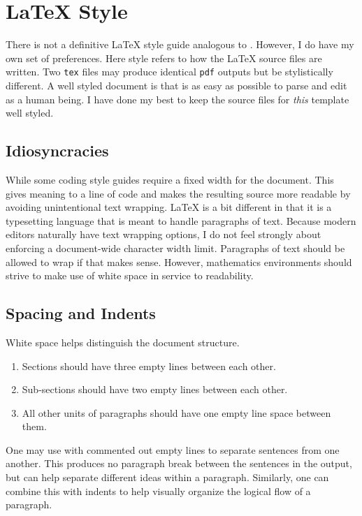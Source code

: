 
\section{\texorpdfstring{\LaTeX{} Style}{LaTeX Style}}

There is not a definitive \LaTeX{} style guide analogous to . However, I do have my own set of preferences. Here style refers to how the \LaTeX{} source files are written. Two \texttt{tex} files may produce identical \texttt{pdf} outputs but be stylistically different. A well styled document is that is as easy as possible to parse and edit as a human being. I have done my best to keep the source files for \emph{this} template well styled.


\subsection{Idiosyncracies}

While some coding style guides require a fixed width for the document. This gives meaning to a line of code and makes the resulting source more readable by avoiding unintentional text wrapping. \LaTeX{} is a bit different in that it is a typesetting language that is meant to handle paragraphs of text. Because modern editors naturally have text wrapping options, I do not feel strongly about enforcing a document-wide character width limit. Paragraphs of text should be allowed to wrap if that makes sense. However, mathematics environments should strive to make use of white space in service to readability.


\subsection{Spacing and Indents}

White space helps distinguish the document structure. 

\begin{enumerate}
	\item Sections should have three empty lines between each other.
	\item Sub-sections should have two empty lines between each other.
	\item All other units of paragraphs should have one empty line space between them.
\end{enumerate}
One may use with commented out empty lines to separate sentences from one another. 
% 
	This produces no paragraph break between the sentences in the output, but can help separate different ideas within a paragraph.
% 
	Similarly, one can combine this with indents to help visually organize the logical flow of a paragraph.


